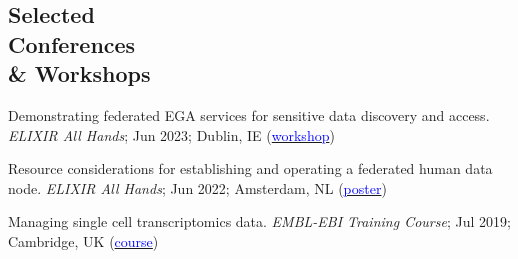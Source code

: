 \documentclass[margin,line]{res}
\begin{document}
\begin{resume}






\section{\sc Selected\\ Conferences\\ \& Workshops}


Demonstrating federated EGA services for sensitive data discovery and access. {\em ELIXIR All Hands}; Jun 2023; Dublin, IE (\href{https://f1000research.com/slides/12-638}{\textcolor{blue}{workshop}})

Resource considerations for establishing and operating a federated human data node. {\em ELIXIR All Hands}; Jun 2022; Amsterdam, NL (\href{https://f1000research.com/posters/11-594}{\textcolor{blue}{poster}})


Managing single cell transcriptomics data. {\em EMBL-EBI Training Course}; Jul 2019; Cambridge, UK (\href{https://www.ebi.ac.uk/training/events/managing-single-cell-transcriptomics-data/}{\textcolor{blue}{course}})


\end{resume}
\end{document}
